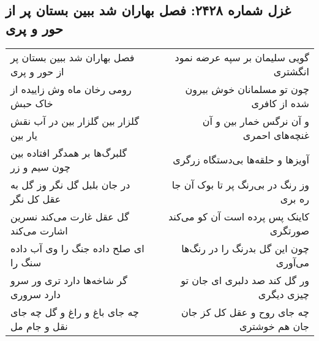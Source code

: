 \begin{center}
\section*{غزل شماره ۲۴۲۸: فصل بهاران شد ببین بستان پر از حور و پری}
\label{sec:2428}
\begin{longtable}{l p{0.5cm} r}
فصل بهاران شد ببین بستان پر از حور و پری
&&
گویی سلیمان بر سپه عرضه نمود انگشتری
\\
رومی رخان ماه وش زاییده از خاک حبش
&&
چون تو مسلمانان خوش بیرون شده از کافری
\\
گلزار بین گلزار بین در آب نقش یار بین
&&
و آن نرگس خمار بین و آن غنچه‌های احمری
\\
گلبرگ‌ها بر همدگر افتاده بین چون سیم و زر
&&
آویزها و حلقه‌ها بی‌دستگاه زرگری
\\
در جان بلبل گل نگر وز گل به عقل کل نگر
&&
وز رنگ در بی‌رنگ پر تا بوک آن جا ره بری
\\
گل عقل غارت می‌کند نسرین اشارت می‌کند
&&
کاینک پس پرده است آن کو می‌کند صورتگری
\\
ای صلح داده جنگ را وی آب داده سنگ را
&&
چون این گل بدرنگ را در رنگ‌ها می‌آوری
\\
گر شاخه‌ها دارد تری ور سرو دارد سروری
&&
ور گل کند صد دلبری ای جان تو چیزی دیگری
\\
چه جای باغ و راغ و گل چه جای نقل و جام مل
&&
چه جای روح و عقل کل کز جان جان هم خوشتری
\\
\end{longtable}
\end{center}
